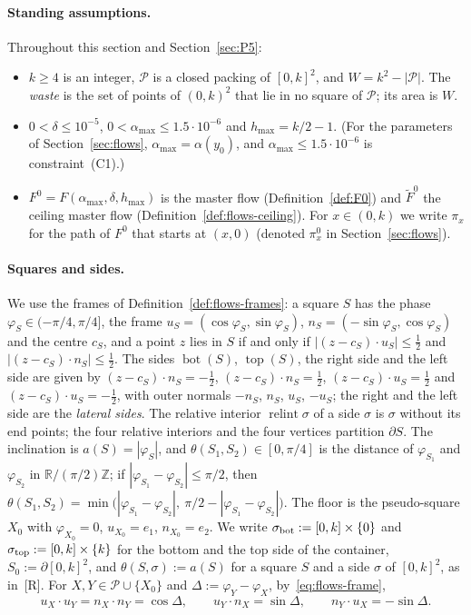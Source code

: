 \documentclass[11pt]{amsart}
\newcommand{\R}{\mathbb R}
\newcommand{\Z}{\mathbb Z}
\newcommand{\cP}{\mathcal P}
\newcommand{\relint}{\operatorname{relint}}
\newcommand{\Bot}{\operatorname{bot}}
\newcommand{\Top}{\operatorname{top}}
\newcommand{\amax}{\alpha_{\max}}
\newcommand{\hmax}{h_{\max}}
\newcommand{\Fz}{F^{0}}
\theoremstyle{definition}
\theoremstyle{remark}
\numberwithin{equation}{section}
\begin{document}
\paragraph{Standing assumptions.} Throughout this section and Section~\ref{sec:P5}:
\begin{itemize}
\item $k\ge4$ is an integer, $\cP$ is a closed packing of $[0,k]^2$, and $W=k^2-|\cP|$. The \emph{waste} is the set of points of $(0,k)^2$ that lie in no square of $\cP$; its area is $W$.
\item $0<\delta\le10^{-5}$, $0<\amax\le1.5\cdot10^{-6}$ and $\hmax=k/2-1$. (For the parameters of Section~\ref{sec:flows}, $\amax=\alpha(y_0)$, and $\amax\le1.5\cdot10^{-6}$ is constraint~(C1).)
\item $\Fz=F(\amax,\delta,\hmax)$ is the master flow (Definition~\ref{def:F0}) and $\tilde F^0$ the ceiling master flow (Definition~\ref{def:flows-ceiling}). For $x\in(0,k)$ we write $\pi_x$ for the path of $\Fz$ that starts at $(x,0)$ (denoted $\pi^0_x$ in Section~\ref{sec:flows}).
\end{itemize}

\paragraph{Squares and sides.} We use the frames of Definition~\ref{def:flows-frames}: a square $S$ has the phase $\varphi_S\in(-\pi/4,\pi/4]$, the frame $u_S=(\cos\varphi_S,\sin\varphi_S)$, $n_S=(-\sin\varphi_S,\cos\varphi_S)$ and the centre $c_S$, and a point $z$ lies in $S$ if and only if $|(z-c_S)\cdot u_S|\le\frac12$ and $|(z-c_S)\cdot n_S|\le\frac12$. The sides $\Bot(S)$, $\Top(S)$, the right side and the left side are given by $(z-c_S)\cdot n_S=-\frac12$, $(z-c_S)\cdot n_S=\frac12$, $(z-c_S)\cdot u_S=\frac12$ and $(z-c_S)\cdot u_S=-\frac12$, with outer normals $-n_S$, $n_S$, $u_S$, $-u_S$; the right and the left side are the \emph{lateral sides}. The relative interior $\relint\sigma$ of a side $\sigma$ is $\sigma$ without its end points; the four relative interiors and the four vertices partition $\partial S$. The inclination is $a(S)=|\varphi_S|$, and $\theta(S_1,S_2)\in[0,\pi/4]$ is the distance of $\varphi_{S_1}$ and $\varphi_{S_2}$ in $\R/(\pi/2)\Z$; if $|\varphi_{S_1}-\varphi_{S_2}|\le\pi/2$, then $\theta(S_1,S_2)=\min\big(|\varphi_{S_1}-\varphi_{S_2}|,\ \pi/2-|\varphi_{S_1}-\varphi_{S_2}|\big)$. The floor is the pseudo-square $X_0$ with $\varphi_{X_0}=0$, $u_{X_0}=e_1$, $n_{X_0}=e_2$. We write $\sigma_{\rm bot}:=[0,k]\times\{0\}$ and $\sigma_{\rm top}:=[0,k]\times\{k\}$ for the bottom and the top side of the container, $S_0:=\partial[0,k]^2$, and $\theta(S,\sigma):=a(S)$ for a square $S$ and a side $\sigma$ of $[0,k]^2$, as in~[R]. For $X,Y\in\cP\cup\{X_0\}$ and $\Delta:=\varphi_Y-\varphi_X$, by~\eqref{eq:flows-frame},
\begin{equation}\label{eq:P3-frames}
u_X\cdot u_Y=n_X\cdot n_Y=\cos\Delta,\qquad u_Y\cdot n_X=\sin\Delta,\qquad n_Y\cdot u_X=-\sin\Delta .
\end{equation}
\end{document}
